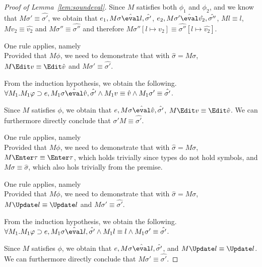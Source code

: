 \begin{proof}[Proof of Lemma~\ref{lem:soundeval}]
{  Since $M$ satisfies both $\phi_1$ and $\phi_2$, and we know that $M\sigma'\equiv \hat{\sigma'}$,
  we obtain that $e_1,M\sigma \hat{\eval}l,\hat{\sigma'}$,
  $e_2,M\sigma'\hat{\eval}\hat{v_2},\hat{\sigma''}$,
  $M l\equiv l$, $M v_2 \equiv \hat{v_2}$ and $M\sigma''\equiv\hat{\sigma''}$ and therefore $M\sigma''[l\mapsto v_2]\equiv\hat{\sigma''}[l\mapsto\hat{v_2}]$.
  }

  {One rule applies, namely \\
  Provided that $M\phi$,
  we need to demonstrate that  with $\hat{\sigma}=M\sigma$,
  $M \Edit v \equiv \Edit \hat{v}$ and $M\sigma'\equiv\hat{\sigma'}$.

  From the induction hypothesis, we obtain the following.\\
  $\forall M_1 .  M_1\phi \implies e, M_1\sigma \hat{\eval}\hat{v},\hat{\sigma'}\land  M_1v\equiv \hat{v} \land  M_1\sigma'\equiv\hat{\sigma'}$.

  Since $M$ satisfies $\phi$,
  we obtain that $e,M\sigma \hat{\eval}\hat{v},\hat{\sigma'}$,
  $M \Edit v\equiv \Edit \hat{v}$.
  We can furthermore directly conclude that $\sigma' M\equiv\hat{\sigma'}$.

  }

  {
  One rule applies, namely \\
  Provided that $M\phi$, we need to demonstrate that  with $\hat{\sigma}=M\sigma$,
  $M \Enter \tau \equiv \Enter \tau$, which holds trivially since types do not hold symbols,
  and $M\sigma\equiv\hat{\sigma}$, which also hols trivially from the premise.
  }

  {One rule applies, namely \\
  Provided that $M\phi$, we need to demonstrate that  with $\hat{\sigma}=M\sigma$,
  $M \Update l \equiv \Update l$ and $M\sigma'\equiv\hat{\sigma'}$.

  From the induction hypothesis, we obtain the following.\\
  $\forall M_1 .  M_1\phi \implies e, M_1\sigma \hat{\eval}l,\hat{\sigma'}\land  M_1 l\equiv l \land  M_1\sigma'\equiv\hat{\sigma'}$.

  Since $M$ satisfies $\phi$,
  we obtain that $e,M\sigma \hat{\eval}l,\hat{\sigma'}$,
  and $M \Update l\equiv \Update l$.
  We can furthermore directly conclude that $M \sigma' \equiv\hat{\sigma'}$.

  }


\end{proof}
